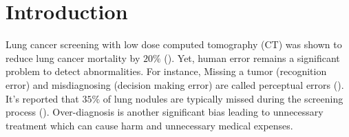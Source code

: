 \documentclass[preprint,12pt]{elsarticle}
\begin{document}

\section{Introduction}
Lung cancer screening with low dose computed tomography (CT) was shown to reduce lung cancer mortality by $20\%$ (\cite{CAAC:CAAC21387}). Yet, human error remains a significant problem to detect abnormalities. For instance, Missing a tumor (recognition error) and misdiagnosing (decision making error) are called perceptual errors (\cite{kundel1978visual}). It's reported that $35\%$ of lung nodules are typically missed during the screening process (\cite{caroline2014lung}). Over-diagnosis is another significant bias leading to unnecessary treatment which can cause harm and unnecessary medical expenses.
%
%
%
%
%
%
%
%
%
%
%
%
%
%
%
%
\end{document}
